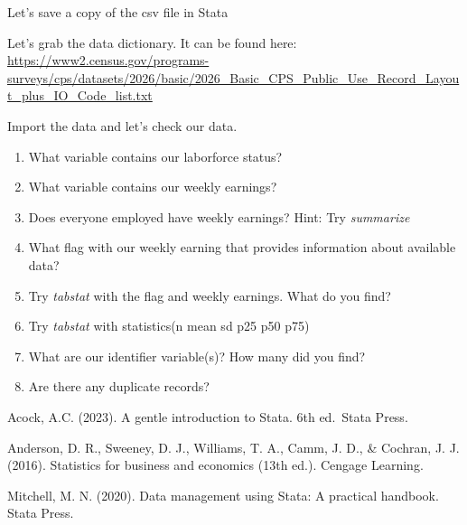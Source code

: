 \documentclass[
]{book}
\providecommand{\tightlist}{%
  \setlength{\itemsep}{0pt}\setlength{\parskip}{0pt}}
\begin{document}
Let's save a copy of the csv file in Stata

Let's grab the data dictionary. It can be found here: \url{https://www2.census.gov/programs-surveys/cps/datasets/2026/basic/2026_Basic_CPS_Public_Use_Record_Layout_plus_IO_Code_list.txt}

Import the data and let's check our data.

\begin{enumerate}
\def\labelenumi{\arabic{enumi}.}
\tightlist
\item
  What variable contains our laborforce status?
\item
  What variable contains our weekly earnings?
\item
  Does everyone employed have weekly earnings? Hint: Try \emph{summarize}
\item
  What flag with our weekly earning that provides information about available data?
\item
  Try \emph{tabstat} with the flag and weekly earnings. What do you find?
\item
  Try \emph{tabstat} with statistics(n mean sd p25 p50 p75)
\item
  What are our identifier variable(s)? How many did you find?
\item
  Are there any duplicate records?
\end{enumerate}

Acock, A.C. (2023). A gentle introduction to Stata. 6th ed.~Stata Press.

Anderson, D. R., Sweeney, D. J., Williams, T. A., Camm, J. D., \& Cochran, J. J. (2016). Statistics for business and economics (13th ed.). Cengage Learning.

Mitchell, M. N. (2020). Data management using Stata: A practical handbook. Stata Press.


\end{document}
